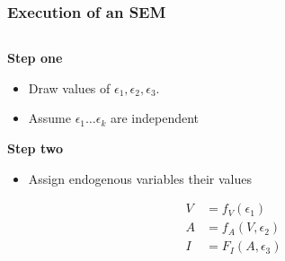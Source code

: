 \documentclass[12pt, block=fill]{beamer}
\begin{document}
\begin{frame}
  \frametitle{Execution of an SEM}
  
  \begin{columns}
    \begin{column}{0.6\textwidth}
      
      \textbf{Step one}
      \begin{itemize}
      \item Draw values of $\epsilon_1, \epsilon_2, \epsilon_3$.
      \item Assume $\epsilon_{1} \dots \epsilon_{k}$ are independent
      \end{itemize} 
    
      \textbf{Step two}
      \begin{itemize}
      \item Assign endogenous variables their values
      \end{itemize} 
      
      \begin{align*}
        V &= f_V(\epsilon_1) \\ 
        A &= f_A(V, \epsilon_2) \\ 
        I &= F_I(A, \epsilon_3) \\
      \end{align*}
      
      

\end{column}
\end{columns}
\end{frame}
\end{document}
